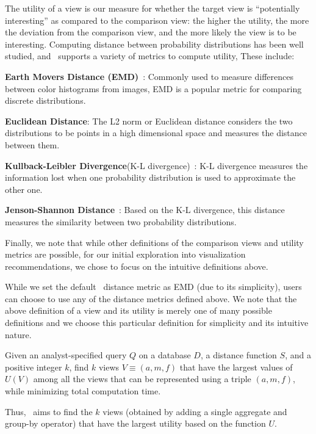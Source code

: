 The utility of a view is our measure for whether the target view is
``potentially interesting'' as compared to the comparison view:
the higher the utility, the more the deviation
from the comparison view, and the more likely the view is to be interesting.
Computing distance between probability distributions has
been well studied, and \SeeDB\ supports a variety of metrics
to compute utility, These include:
\squishlist
  \item {\bf Earth Movers Distance (EMD)}~\cite{wikipedia-prob-dist}: Commonly used to
  measure differences between color histograms from images, EMD is a popular metric for comparing
  discrete distributions.
  \item {\bf Euclidean Distance}: The L2 norm or
  Euclidean distance considers the two distributions to be points in a high
  dimensional space and measures the distance between them.
  \item {\bf Kullback-Leibler Divergence}(K-L divergence)~\cite{wikipedia-KL}:
  K-L divergence measures the information lost when one probability distribution is used to approximate
  the other one.
  \item {\bf Jenson-Shannon Distance}~\cite{wikipedia-JS,entropy-vis}: Based on
  the K-L divergence, this distance measures the similarity between two probability distributions.
\squishend
{}

Finally, we note that while other definitions of the comparison views and
utility metrics are possible, for our initial exploration into 
visualization recommendations, we chose to focus on the intuitive definitions above.

While we set the default \SeeDB\ distance metric as EMD (due to its simplicity),
users can choose to use any of the distance metrics defined above. We note that
the above definition of a view and its utility is merely one of many possible
definitions and we choose this particular definition for simplicity and its
intuitive nature. 
\begin{problem}
\vspace{-5pt}
Given an analyst-specified query $Q$ on a database $D$, a distance function $S$,
and a positive integer $k$, find $k$ views $V \equiv (a, m, f)$ that
have the largest values of $U(V)$ among all the views that can be represented
using a triple $(a, m, f)$, while minimizing total computation time.
\vspace{-5pt}
\end{problem}
Thus, \SeeDB\ aims to find the $k$ views (obtained by adding a single aggregate
 and group-by operator) that have the largest utility based on the function $U$.

